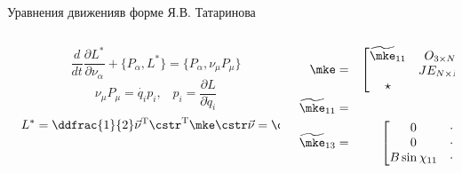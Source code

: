 \begin{frame}{Уравнения движения}{в форме Я.В. Татаринова}
    \begin{columns}
        \hspace{-4pt}
        \begin{column}{0.4\textwidth}
            \vspace{-40pt}
            \begin{equation*}
            \qquad
            \frac{d}{dt}\frac{\partial L^{*}}{\partial \nu_\alpha}  + \{P_\alpha, L^{*}\} = \{P_\alpha, \nu_\mu P_\mu\}
            \end{equation*}
            $$
            \qquad
            \nu_\mu P_\mu = \dot{q_i} p_i, \hspace{10pt} p_i = \frac{\partial L}{\partial \dot{q}_i}
            $$
            \vspace{20pt}
            $$
            \quad
            L^{*}  = \ddfrac{1}{2}\vec{\nu}^\mathrm{T} \cstr^\mathrm{T}\mke \cstr\vec{\nu} = \ddfrac{1}{2}\vec{\nu}^\mathrm{T} \mke^*(\chi_i)\vec{\nu}
            $$
        \end{column}
        \hspace{46pt}
        \begin{column}{0.6\textwidth}
            \vspace{-20pt}
            \begin{eqnarray*}
                \mke & = &
                    \begin{bmatrix}
                        \widetilde{\mke}_{11} & O_{3 \times N}  & \widetilde{\mke}_{13} \\
                                            & JE_{N \times N} & O_{N \times Nn}     \\
                        \star               &                 & BE_{Nn \times Nn}   \\
                    \end{bmatrix} \\
                \widetilde{\mke}_{11} & = & \text{diag}(M, M, I_S) \\
                \widetilde{\mke}_{13} & = &
                    \begin{bmatrix}
                        0                      & \cdots & 0                      \\
                        0                      & \cdots & 0                      \\
                        B\sin\chi_{11}         & \cdots & B\sin\chi_{Nn}         \\

\end{bmatrix}
\end{eqnarray*}
\end{column}
\end{columns}
\end{frame}
